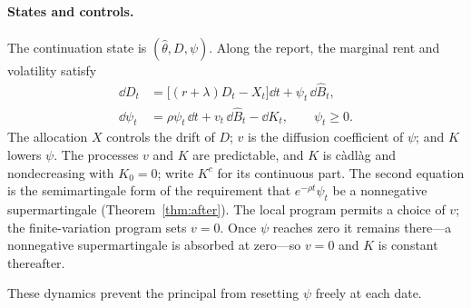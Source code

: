 \documentclass[12pt]{article}
\newcommand{\hth}{\hat\theta}
\newcommand{\hB}{\hat B}
\begin{document}
\paragraph{States and controls.}
The continuation state is \((\hth,D,\psi)\). Along the report, the
marginal rent and volatility satisfy
\begin{align}
  \dd D_t
  &=
  \bigl[(r+\lambda)D_t-X_t\bigr]\dd t
  +\psi_{t}\,\dd\hB_t,
  \label{eq:promise-dynamics}\\
  \dd\psi_t
  &=
  \rho\psi_t\,\dd t
  +v_t\,\dd\hB_t
  -\dd K_t,
  \qquad
  \psi_t\geq0.
  \label{eq:volatility-control}
\end{align}
The allocation \(X\) controls the drift of \(D\); \(v\) is the diffusion
coefficient of \(\psi\); and \(K\) lowers \(\psi\). The processes \(v\)
and \(K\) are predictable, and \(K\) is c\`adl\`ag and nondecreasing
with \(K_0=0\); write \(K^c\) for its continuous part.
The second equation is the semimartingale form of the requirement that
\(e^{-\rho t}\psi_t\) be a nonnegative supermartingale
(Theorem~\ref{thm:after}). The local program permits a choice of \(v\); the
finite-variation program sets \(v=0\). Once \(\psi\) reaches zero it
remains there---a nonnegative supermartingale is absorbed at
zero---so \(v=0\) and \(K\) is constant thereafter.

These dynamics prevent the principal from resetting \(\psi\) freely
at each date.
\end{document}
